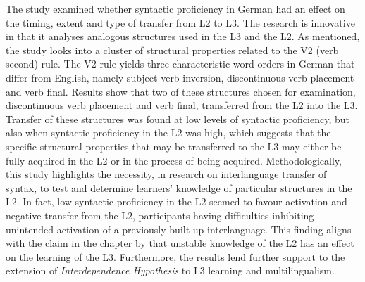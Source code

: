 \documentclass[output=paper,colorlinks,citecolor=brown,nonflat]{langsci/langscibook}
\begin{document}
The study examined whether syntactic proficiency in German had an effect on the timing, extent and type of transfer from L2 to L3. The research is innovative in that it analyses analogous structures used in the L3 and the L2. As mentioned, the study looks into a cluster of structural properties related to the V2 (verb second) rule. The V2 rule yields three characteristic word orders in German that differ from English, namely subject-verb inversion, discontinuous verb placement and verb final. Results show that two of these structures chosen for examination, discontinuous verb placement and verb final, transferred from the L2 into the L3. Transfer of these structures was found at low levels of syntactic proficiency, but also when syntactic proficiency in the L2 was high, which suggests that the specific structural properties that may be transferred to the L3 may either be fully acquired in the L2 or in the process of being acquired. Methodologically, this study highlights the necessity, in research on interlanguage transfer of syntax, to test and determine learners’ knowledge of particular structures in the L2. In fact, low syntactic proficiency in the L2 seemed to favour activation and negative transfer from the L2, participants having difficulties inhibiting unintended activation of a previously built up interlanguage. This finding aligns with the claim in the chapter by \citeauthor{chapters/pfenninger} that unstable knowledge of the L2 has an effect on the learning of the L3. Furthermore, the results lend further support to the extension of  \textit{Interdependence Hypothesis} to L3 learning and multilingualism.
\end{document}
